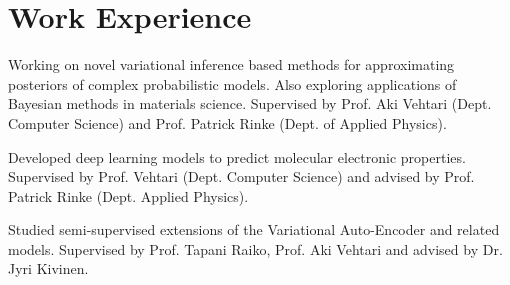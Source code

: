 \documentclass[]{deedy-resume}
\begin{document}
\begin{minipage}[t]{0.62\textwidth} 


\section{Work Experience}
\vspace{\topsep} %
\begin{tightemize}
\item Working on novel variational inference based methods for approximating posteriors of complex probabilistic models. Also exploring applications of Bayesian methods in materials science. Supervised by Prof. Aki Vehtari (Dept. Computer Science) and Prof. Patrick Rinke (Dept. of Applied Physics).
\end{tightemize}
\sectionsep




\begin{tightemize}
	\item Developed deep learning models to predict molecular electronic properties. Supervised by Prof. Vehtari (Dept. Computer Science) and advised by Prof. Patrick Rinke (Dept. Applied Physics).
	
	\item Studied semi-supervised extensions of the Variational Auto-Encoder and related models. Supervised by Prof. Tapani Raiko, Prof. Aki Vehtari and advised by Dr. Jyri Kivinen. 
\end{tightemize}
\sectionsep


\end{minipage}
\end{document}
